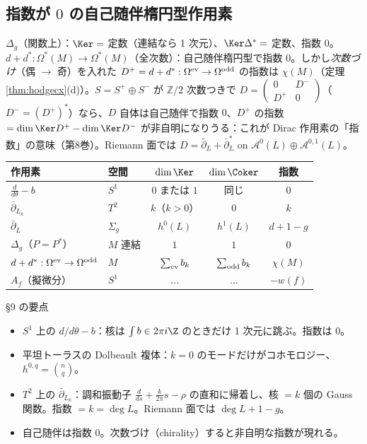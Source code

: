 \subsection{指数が $0$ の自己随伴楕円型作用素}
\begin{ex}\label{ex:selfadj}
$\Delta_g$（関数上）：$\Ker=$ 定数（連結なら 1 次元）、$\Ker\Delta^*=$ 定数、指数 $0$。$d+d^*:\Omega^*(M)\to\Omega^*(M)$（全次数）：自己随伴楕円型で指数 $0$。しかし\emph{次数づけ}（偶 $\to$ 奇）を入れた $D^+=d+d^*:\Omega^{\rm ev}\to\Omega^{\rm odd}$ の指数は $\chi(M)$（定理 \ref{thm:hodgecx}(d)）。$S=S^+\oplus S^-$ が $\mathbb Z/2$ 次数つきで $D=\begin{pmatrix}0&D^-\\D^+&0\end{pmatrix}$（$D^-=(D^+)^*$）なら、$D$ 自体は自己随伴で指数 $0$、$D^+$ の指数 $=\dim\Ker D^+-\dim\Ker D^-$ が非自明になりうる：これが Dirac 作用素の「指数」の意味（第8巻）。Riemann 面では $D=\bar\partial_L+\bar\partial_L^*$ on $\mathcal A^0(L)\oplus\mathcal A^{0,1}(L)$。
\end{ex}
\begin{center}
\renewcommand{\arraystretch}{1.15}
\begin{tabular}{llccc}
\toprule
作用素 & 空間 & $\dim\Ker$ & $\dim\Coker$ & 指数\\
\midrule
$\frac d{d\theta}-b$ & $S^1$ & $0$ または $1$ & 同じ & $0$\\
$\bar\partial_{L_k}$ & $T^2$ & $k$（$k>0$） & $0$ & $k$\\
$\bar\partial_L$ & $\Sigma_g$ & $h^0(L)$ & $h^1(L)$ & $d+1-g$\\
$\Delta_g$（$P=P^*$） & $M$ 連結 & $1$ & $1$ & $0$\\
$d+d^*:\Omega^{\rm ev}\to\Omega^{\rm odd}$ & $M$ & $\sum_{\rm ev}b_k$ & $\sum_{\rm odd}b_k$ & $\chi(M)$\\
$A_f$（擬微分） & $S^1$ & $\ldots$ & $\ldots$ & $-w(f)$\\
\bottomrule
\end{tabular}
\end{center}
\begin{keybox}{§9 の要点}
\begin{itemize}
\item $S^1$ 上の $d/d\theta-b$：核は $\int b\in2\pi i\Z$ のときだけ 1 次元に跳ぶ。指数は $0$。
\item 平坦トーラスの Dolbeault 複体：$k=0$ のモードだけがコホモロジー、$h^{0,q}=\binom nq$。
\item $T^2$ 上の $\bar\partial_{L_k}$：調和振動子 $\frac d{ds}+\frac k{2\pi}s-\rho$ の直和に帰着し、核 $=k$ 個の Gauss 関数。指数 $=k=\deg L$。Riemann 面では $\deg L+1-g$。
\item 自己随伴は指数 $0$。次数づけ（chirality）すると非自明な指数が現れる。
\end{itemize}
\end{keybox}

